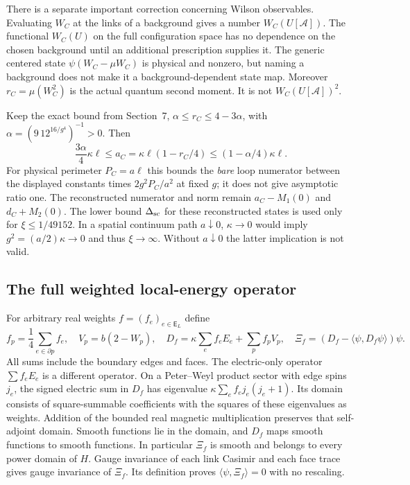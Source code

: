 \documentclass[11pt]{article}
\begin{document}
There is a separate important correction concerning Wilson observables.
Evaluating $W_C$ at the links of a background gives a number $W_C(U[\mathcal A])$.
The functional $W_C(U)$ on the full configuration space has no dependence
on the chosen background until an additional prescription supplies it.
The generic centered state $\psi(W_C-\mu W_C)$ is physical and nonzero,
but naming a background does not make it a background-dependent state map.
Moreover $r_C=\mu(W_C^2)$ is the actual quantum second moment. It is not
$W_C(U[\mathcal A])^2$.

Keep the exact bound from Section~7,
$\alpha\le r_C\le4-3\alpha$, with
$\alpha=(9\,12^{16/g^4})^{-1}>0$. Then
\begin{equation}\label{eq:fabel-loop-scale-corrected}
 \frac{3\alpha}{4}\kappa\ell\le
 a_C=\kappa\ell(1-r_C/4)
 \le(1-\alpha/4)\kappa\ell .
\end{equation}
For physical perimeter $P_C=a\ell$ this bounds the \emph{bare} loop
numerator between the displayed constants times $2g^2P_C/a^2$ at fixed $g$;
it does not give asymptotic ratio one. The reconstructed numerator and norm
remain $a_C-M_1(0)$ and $d_C+M_2(0)$.
The lower bound $\Delta_{\rm sc}$ for these reconstructed states is used
only for $\xi\le1/49152$. In a spatial continuum path $a\downarrow0$,
$\kappa\to0$ would imply $g^2=(a/2)\kappa\to0$ and thus $\xi\to\infty$.
Without $a\downarrow0$ the latter implication is not valid.

\subsection{The full weighted local-energy operator}
For arbitrary real weights $f=(f_e)_{e\in\mathsf E_L}$ define
\begin{equation}\label{eq:fabel-local-D}
 f_p=\frac14\sum_{e\in\partial p}f_e,\quad
 V_p=b(2-W_p),\quad
 D_f=\kappa\sum_ef_eE_e+\sum_pf_pV_p,\quad
 \Xi_f=(D_f-\langle\psi,D_f\psi\rangle)\psi .
\end{equation}
All sums include the boundary edges and faces.
The electric-only operator $\sum f_eE_e$ is a different operator.
On a Peter--Weyl product sector with edge spins $j_e$, the signed electric
sum in $D_f$ has eigenvalue $\kappa\sum_ef_ej_e(j_e+1)$.
Its domain consists of square-summable coefficients with the squares of
these eigenvalues as weights. Addition of the bounded real magnetic
multiplication preserves that self-adjoint domain. Smooth functions lie in
the domain, and $D_f$ maps smooth functions to smooth functions.
In particular $\Xi_f$ is smooth and belongs to every power domain of $H$.
Gauge invariance of each link Casimir and each face trace gives
gauge invariance of $\Xi_f$. Its definition proves
$\langle\psi,\Xi_f\rangle=0$ with no rescaling.
\end{document}
